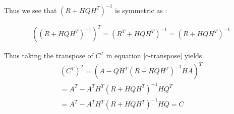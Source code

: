 \documentclass{tufte-handout}
\begin{document}
Thus we see that $(R + HQH^T)^{-1}$ is symmetric as : 

\begin{multline}
   ((R + HQH^T)^{-1} )^T =  (R^T + HQH^T)^{-1} = (R + HQH^T)^{-1}
\end{multline}

Thus taking  the transpose of  $C^T$ in equation \ref{c-transpose} yields 
\begin{multline}
   (C^T)^T = (A - QH^T (R + HQH^T)^{-1} H A)^T  \\
   = A^T - A^T H^T ( R +   HQH^T)^{-1} H Q^T \\ 
   =A^T - A^T H^T ( R +   HQH^T)^{-1} H Q  = C
\end{multline}



\end{document}
